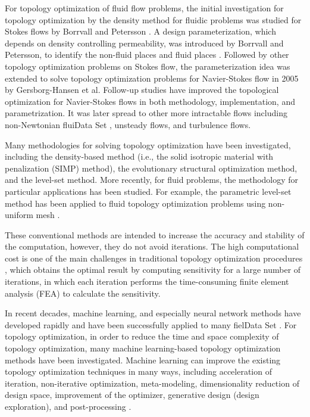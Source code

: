 \documentclass{article}
\begin{document}
For topology optimization of fluid flow problems, the initial investigation for topology optimization by the density method for fluidic problems was studied for Stokes flows by Borrvall and Petersson \cite{5-borrvall2003topology}. A design parameterization, which depends on density controlling permeability, was introduced by Borrvall and Petersson, to identify the non-fluid places and fluid places \cite{5-borrvall2003topology}.
Followed by other topology optimization problems on Stokes flow\cite{5-1-guillaume2004topological, 5-2-aage2008topology}, the parameterization idea was extended to solve topology optimization problems for Navier-Stokes flow in 2005 by Gersborg-Hansen et al. \cite{9-4-gersborg2005topology} Follow-up studies have improved the topological optimization for Navier-Stokes flows in both methodology\cite{Intro-3-guest2006topology, Intro-4-wiker2007topology}, implementation\cite{Intro-2-olesen2006high, Intro-7-othmer2008continuous}, and parametrization\cite{Intro-5-bruns2007topology}. It was later spread to other more intractable flows including non-Newtonian fluiData Set \cite{9-6-pingen2010optimal, Intro-6-ejlebjerg2012topology}, unsteady flows\cite{9-5-deng2011topology, Intro-11-deng2013topology}, and turbulence flows\cite{Intro-8-yoon2016topology, Intro-9-dilgen2018density, Intro-10-yoon2020topology}.

Many methodologies for solving topology optimization have been investigated, including the density-based method (i.e., the solid isotropic material with penalization (SIMP) method), the evolutionary structural optimization method, and the level-set method. More recently, for fluid problems, the methodology for particular applications has been studied. For example, the parametric level-set method has been applied to fluid topology optimization problems using non-uniform mesh \cite{10-2-li2022topology}.

These conventional methods are intended to increase the accuracy and stability of the computation, however, they do not avoid iterations. The high computational cost is one of the main challenges in traditional topology optimization procedures \cite{0-0-shin2022topology}, which obtains the optimal result by computing sensitivity for a large number of iterations, in which each iteration performs the time-consuming finite element analysis (FEA) to calculate the sensitivity.

In recent decades, machine learning, and especially neural network methods have developed rapidly and have been successfully applied to many fielData Set \cite{0-0-shin2022topology}. For topology optimization, in order to reduce the time and space complexity of topology optimization, many machine learning-based topology optimization methods have been investigated. Machine learning can improve the existing topology optimization techniques in many ways, including acceleration of iteration, non-iterative optimization, meta-modeling, dimensionality reduction of design space, improvement of the optimizer, generative design (design exploration), and post-processing \cite{0-0-shin2022topology}. 
\end{document}
